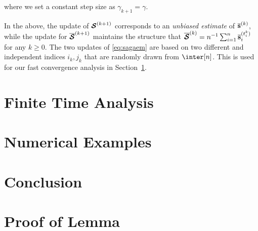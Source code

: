 \documentclass[11pt]{article}
\theoremstyle{t}
\begin{document}
where we set a constant step size as $\gamma_{k+1} = \gamma$.

In the above, the update of ${\bm{\mathcal{S}}}^{(k+1)}$ corresponds to an \emph{unbiased estimate} of $\overline{{\mathbf{s}}}^{(k)}$, while the update for $\overline{{\bm{\mathcal{S}}}}^{(k+1)}$ maintains the structure that $\overline{{\bm{\mathcal{S}}}}^{(k)} = n^{-1} \sum_{i=1}^n \overline{{\mathbf{s}}}_i^{(t_i^k)}$ for any $k \geq 0$.
The two updates of \eqref{eq:sagaem} are based on two different and independent indices $i_k,j_k$ that are randomly drawn from $\inter[n]$. This is used for our fast convergence analysis in Section~\ref{sec:main}.


\section{Finite Time Analysis} \label{sec:main}



\section{Numerical Examples}

\section{Conclusion}


\newpage
\linespread{1.1}
\normalsize




\linespread{1}
\newpage
\appendix
\section{Proof of Lemma}
\end{document}
